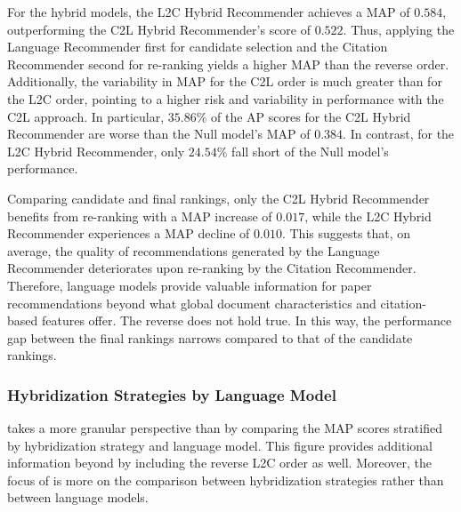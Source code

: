 For the hybrid models, the \ac{L2C} Hybrid Recommender achieves a \ac{MAP} of $0.584$, outperforming the \ac{C2L} Hybrid Recommender's score of $0.522$.
Thus, applying the Language Recommender first for candidate selection and the Citation Recommender second for re-ranking yields a higher \ac{MAP} than the reverse order.
Additionally, the variability in \ac{MAP} for the \ac{C2L} order is much greater than for the \ac{L2C} order, pointing to a higher risk and variability in performance with the \ac{C2L} approach.
In particular, $35.86\%$ of the \ac{AP} scores for the \ac{C2L} Hybrid Recommender are worse than the Null model's \ac{MAP} of $0.384$. In contrast, for the \ac{L2C} Hybrid Recommender, only $24.54\%$ fall short of the Null model's performance.

Comparing candidate and final rankings, only the \ac{C2L} Hybrid Recommender benefits from re-ranking with a \ac{MAP} increase of $0.017$, while the \ac{L2C} Hybrid Recommender experiences a \ac{MAP} decline of $0.010$.
This suggests that, on average, the quality of recommendations generated by the Language Recommender deteriorates upon re-ranking by the Citation Recommender.
Therefore, language models provide valuable information for paper recommendations beyond what global document characteristics and citation-based features offer. The reverse does not hold true.
In this way, the performance gap between the final rankings narrows compared to that of the candidate rankings.


\subsubsection*{Hybridization Strategies by Language Model}

 takes a more granular perspective than  by comparing the \ac{MAP} scores stratified by hybridization strategy and language model.
This figure provides additional information beyond  by including the reverse \ac{L2C} order as well.
Moreover, the focus of  is more on the comparison between hybridization strategies rather than between language models.

